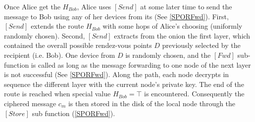 
Once Alice get the \(H_{Bob}\), Alice uses \([Send]\) at some
later time to send the message to Bob using any of her devices from
its \squad (See \cref{SPORFwd}). First, \([Send]\) extends the route
\(H_{Bob}\) with some hops of Alice's choosing (uniformly randomly
chosen). Second, \([Send]\) extracts from the onion the first
layer, which contained the overall
possible rendez-vous points $D$ previously selected by the recipient (i.e. Bob).
One device from $D$ is randomly chosen, and the \([Fwd]\)
sub-function is called as long as the message forwarding to one node of
the next layer is not successful (See \cref{SPORFwd}). Along the path, each node decrypts
in sequence the different layer with the current node’s private key. 
The end of the route is reached when special value \(H_{Bob} = \top\) is
encountered. Consequently the ciphered message \(c_m\) is then stored
in the disk of the local node through the \([Store]\) sub function 
(\cref{SPORFwd}).





 


